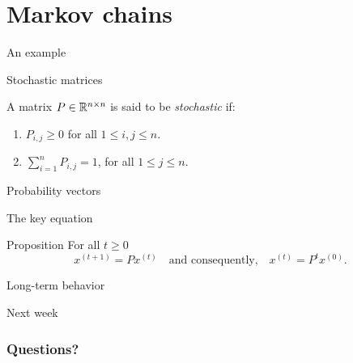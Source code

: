 \documentclass{beamer}
\begin{document}
\section{Markov chains}

\begin{frame}[t]{An example}
	\grid

\end{frame}

\begin{frame}[t]{Stochastic matrices}
	\grid

\begin{definition}
	A matrix $P \in \mathbb{R}^{n \times n}$ is said to be \emph{stochastic} if:
	\begin{enumerate}
		\item $P_{i,j} \geq 0$ for all $1 \leq i,j \leq n$.
		\item $\sum\limits_{i=1}^n P_{i,j} = 1$, for all $1 \leq j \leq n$.
	\end{enumerate}
\end{definition}
\end{frame}
\begin{frame}[t]{Probability vectors}
	\grid

\end{frame}

\begin{frame}[t]{The key equation}
	\grid

	\vspace{-0.4cm}
	\begin{block}{Proposition}
	For all $t \geq 0$
	$$
	x^{(t+1)} = P x^{(t)}
	\quad \text{and consequently,} \quad
	x^{(t)} =  P^t x^{(0)}.
	$$
\end{block}

\end{frame}

\begin{frame}[t]{Long-term behavior}
	\grid


\end{frame}

\begin{frame}[t]{Next week}
	\grid


\end{frame}

\appendix
\backupbegin
\begin{frame}[t]
	\frametitle{Questions?}
	\grid
	
	\pause
\end{frame}
\backupend
\end{document}
